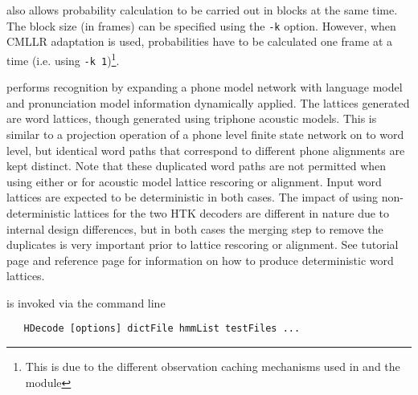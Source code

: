  also allows probability calculation to be carried out in
blocks at the same time. The block size (in frames) can be specified using
the \texttt{-k} option. However, when CMLLR adaptation is used, probabilities
have to be calculated one frame at a time (i.e. using \texttt{-k 1})\footnote{
This is due to the different observation caching mechanisms used in
 and the  module}.

 performs recognition by expanding a phone model network with
language model and pronunciation model information dynamically applied. The
lattices generated are word lattices, though generated using triphone
acoustic models. This is similar to a projection operation of a phone level
finite state network on to word level, but identical word paths that
correspond to different phone alignments are kept distinct.  Note that these
duplicated word paths are not permitted when using either  or
 for acoustic model lattice rescoring or alignment.  Input word
lattices are expected to be deterministic in both cases.  The impact of using
non-deterministic lattices for the two HTK decoders are different in nature
due to internal design differences, but in both cases the merging step to
remove the duplicates is very important prior to lattice rescoring or
alignment.  See  tutorial page and  reference
page for information on how to produce deterministic word lattices.



 is invoked via the command line
\begin{verbatim}
   HDecode [options] dictFile hmmList testFiles ...
\end{verbatim}

